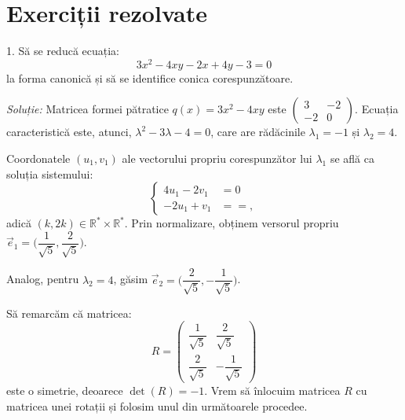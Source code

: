 \documentclass[11pt,a4paper]{article}
\theoremstyle{dotless}
\theoremstyle{dotlessdr}
\begin{document}


\section{Exerciții rezolvate}

1. Să se reducă ecuația: 
 \[
	3x^2 - 4xy - 2x + 4y - 3 = 0
\]
la forma canonică și să se identifice conica corespunzătoare.

\emph{Soluție:}
	Matricea formei pătratice $q(x) = 3x^2 - 4xy$ este $\begin{pmatrix}
	                                                       3 & -2 \\
	                                                       -2 & 0
                                                       \end{pmatrix}$.
    Ecuația caracteristică este, atunci, $\lambda^2 - 3\lambda - 4 = 0$, care
are rădăcinile $\lambda_1 = -1$ și $\lambda_2 = 4$.

Coordonatele $(u_1, v_1)$ ale vectorului propriu corespunzător lui $\lambda_1$
se află ca soluția sistemului: 
 \[
	\begin{cases}	
	    4u_1 - 2v_1 &= 0 \\
	    -2 u_1 + v_1 &= =,
    \end{cases}
\]
adică $(k, 2k) \in \mathbb{R}^\ast \times \mathbb{R}^\ast$. Prin normalizare,
obținem versorul propriu 
$\vec{e}_1 = \Big( \dfrac{1}{\sqrt{5}}, \dfrac{2}{\sqrt{5}} \Big)$.

Analog, pentru $\lambda_2 = 4$, găsim 
$\vec{e}_2 = \Big( \dfrac{2}{\sqrt{5}}, - \dfrac{1}{\sqrt{5}} \Big)$.

Să remarcăm că matricea: 
 \[
	R = \begin{pmatrix}
	        \dfrac{1}{\sqrt{5}} & \dfrac{2}{\sqrt{5}} \\
	        \dfrac{2}{\sqrt{5}} & - \dfrac{1}{\sqrt{5}}
        \end{pmatrix}
\]
este o simetrie, deoarece $\det(R) = -1$. Vrem să înlocuim matricea $R$ cu
matricea unei rotații și folosim unul din următoarele procedee.
\end{document}
